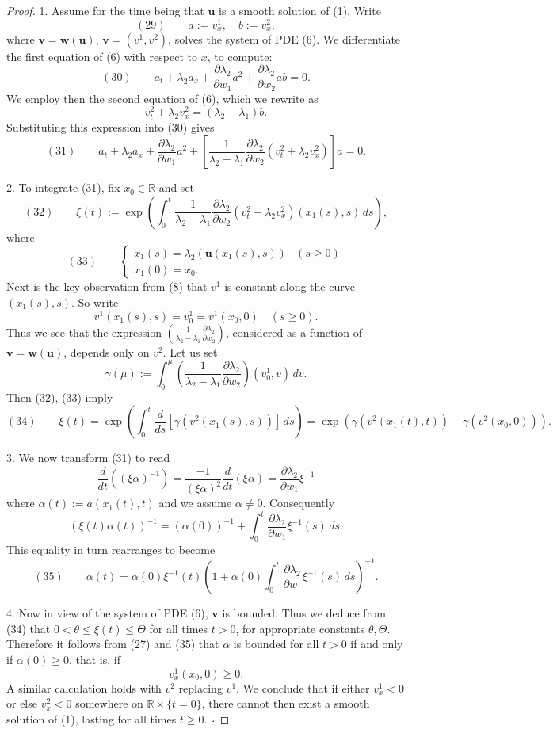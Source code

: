 \begin{proof}
1. Assume for the time being that $\mathbf{u}$ is a smooth solution of (1). Write
$$(29) \qquad a := v^1_x, \quad b := v^2_x,$$
where $\mathbf{v} = \mathbf{w}(\mathbf{u})$, $\mathbf{v}=(v^1,v^2)$, solves the system of PDE (6). We differentiate the first equation of (6) with respect to $x$, to compute:
$$(30) \qquad a_t + \lambda_2 a_x + \frac{\partial\lambda_2}{\partial w_1}a^2 + \frac{\partial\lambda_2}{\partial w_2}ab = 0.$$
We employ then the second equation of (6), which we rewrite as
$$v^2_t + \lambda_2 v^2_x = (\lambda_2-\lambda_1)b.$$
Substituting this expression into (30) gives
$$(31) \qquad a_t + \lambda_2 a_x + \frac{\partial\lambda_2}{\partial w_1}a^2 + \left[\frac{1}{\lambda_2-\lambda_1}\frac{\partial\lambda_2}{\partial w_2}(v^2_t+\lambda_2 v^2_x)\right]a = 0.$$

2. To integrate (31), fix $x_0\in\mathbb{R}$ and set
$$(32) \qquad \xi(t) := \exp\left(\int_0^t \frac{1}{\lambda_2-\lambda_1}\frac{\partial\lambda_2}{\partial w_2}(v^2_t+\lambda_2 v^2_x)(x_1(s),s)\,ds\right),$$
where
$$(33) \qquad \begin{cases} \dot x_1(s) = \lambda_2(\mathbf{u}(x_1(s),s)) & (s\geq 0) \\ x_1(0) = x_0. \end{cases}$$
Next is the key observation from (8) that $v^1$ is constant along the curve $(x_1(s),s)$. So write
$$v^1(x_1(s),s) = v^1_0 = v^1(x_0,0) \quad (s\geq 0).$$
Thus we see that the expression $\left(\frac{1}{\lambda_2-\lambda_1}\frac{\partial\lambda_2}{\partial w_2}\right)$, considered as a function of $\mathbf{v}=\mathbf{w}(\mathbf{u})$, depends only on $v^2$. Let us set
$$\gamma(\mu) := \int_0^\mu \left(\frac{1}{\lambda_2-\lambda_1}\frac{\partial\lambda_2}{\partial w_2}\right)(v^1_0,v)\,dv.$$
Then (32), (33) imply
$$(34) \qquad \xi(t) = \exp\left(\int_0^t \frac{d}{ds}[\gamma(v^2(x_1(s),s))]\,ds\right) = \exp(\gamma(v^2(x_1(t),t)) - \gamma(v^2(x_0,0))).$$

3. We now transform (31) to read
$$\frac{d}{dt}((\xi\alpha)^{-1}) = \frac{-1}{(\xi\alpha)^2}\frac{d}{dt}(\xi\alpha) = \frac{\partial\lambda_2}{\partial w_1}\xi^{-1}$$
where $\alpha(t) := a(x_1(t),t)$ and we assume $\alpha\neq 0$. Consequently
$$(\xi(t)\alpha(t))^{-1} = (\alpha(0))^{-1} + \int_0^t \frac{\partial\lambda_2}{\partial w_1}\xi^{-1}(s)\,ds.$$
This equality in turn rearranges to become
$$(35) \qquad \alpha(t) = \alpha(0)\xi^{-1}(t)\left(1 + \alpha(0)\int_0^t \frac{\partial\lambda_2}{\partial w_1}\xi^{-1}(s)\,ds\right)^{-1}.$$

4. Now in view of the system of PDE (6), $\mathbf{v}$ is bounded. Thus we deduce from (34) that $0<\theta\leq\xi(t)\leq\Theta$ for all times $t>0$, for appropriate constants $\theta,\Theta$. Therefore it follows from (27) and (35) that $\alpha$ is bounded for all $t>0$ if and only if $\alpha(0)\geq 0$, that is, if
$$v^1_x(x_0,0) \geq 0.$$
A similar calculation holds with $v^2$ replacing $v^1$. We conclude that if either $v^1_x<0$ or else $v^2_x<0$ somewhere on $\mathbb{R}\times\{t=0\}$, there cannot then exist a smooth solution of (1), lasting for all times $t\geq 0$. $\square$
\end{proof}

